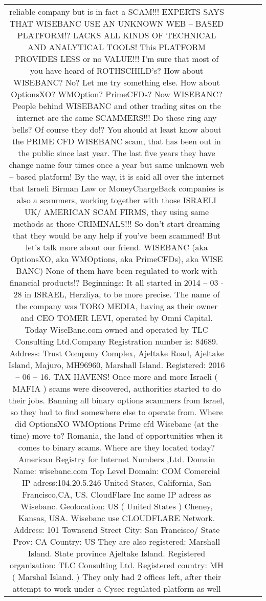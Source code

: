 \documentclass[11pt]{article}
\newlength\mylength
\begin{document}
\begin{center}
\begin{longtable}{|C{.65\mylength}|C{.30\mylength}|C{.12\mylength}|C{.12\mylength}|C{.12\mylength}|}
reliable company but is in fact a SCAM!!!
EXPERTS SAYS THAT WISEBANC USE AN UNKNOWN WEB – BASED PLATFORM!?
LACKS ALL KINDS OF TECHNICAL AND ANALYTICAL TOOLS! This PLATFORM
PROVIDES LESS or no VALUE!!!
I'm sure that most of you have heard of ROTHSCHILD's? How about WISEBANC?
No?
Let me try something else.
How about OptionsXO? WMOption? PrimeCFDs? Now WISEBANC? People behind WISEBANC
and other trading sites on the internet are the same SCAMMERS!!!
Do these ring any bells?
Of course they do!?
You should at least know about the PRIME CFD WISEBANC scam, that has been out in the public
since last year. The last five years they have change name four times once a year but same unknown
web – based platform! By the way, it is said all over the internet that Israeli Birman Law or
MoneyChargeBack companies is also a scammers, working together with those ISRAELI UK/
AMERICAN SCAM FIRMS, they using same methods as those CRIMINALS!!!
So don't start dreaming that they would be any help if you've been scammed! But let's talk more
about our friend.
WISEBANC (aka OptionsXO, aka WMOptions, aka PrimeCFDs), aka WISE BANC) None of them
have been regulated to work with financial products!?
Beginnings: It all started in 2014 – 03 - 28 in ISRAEL, Herzliya, to be more precise. The name of
the company was TORO MEDIA, having as their owner and CEO TOMER LEVI, operated by
Omni Capital. Today WiseBanc.com owned and operated by TLC Consulting Ltd.Company
Registration number is: 84689. Address: Trust Company Complex, Ajeltake Road, Ajeltake Island,
Majuro, MH96960, Marshall Island. Registered: 2016 – 06 – 16. TAX HAVENS! Once more and
more Israeli ( MAFIA ) scams were discovered, authorities started to do their jobs. Banning all
binary options scammers from Israel, so they had to find somewhere else to operate from.
Where did OptionsXO WMOptions Prime cfd  Wisebanc (at the time) move to? Romania, the
land of opportunities when it comes to binary scams.
Where are they located today?
American Registry for Internet Numbers ,Ltd. Domain Name: wisebanc.com Top Level Domain:
COM Comercial IP adress:104.20.5.246 United States, California, San Francisco,CA, US.
CloudFlare Inc same IP adress as Wisebanc. Geolocation: US ( United States ) Cheney, Kansas,
USA. Wisebanc use CLOUDFLARE Network. Address: 101 Townsend Street City: San Francisco/
State Prov: CA Country: US They are also registered: Marshall Island. State province Ajeltake
Island. Registered organisation: TLC Consulting Ltd. Registered country: MH ( Marshal Island. )
They only had 2 offices left, after their attempt to work under a Cysec regulated platform as well

\end{longtable}
\end{center}
\end{document}
